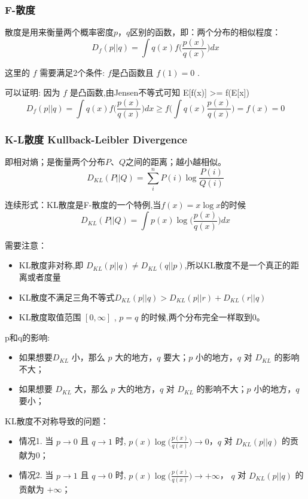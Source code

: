 \documentclass[12pt]{article}
\begin{document}
\subsubsection{F-散度}
散度是用来衡量两个概率密度$p$，$q$区别的函数，即：两个分布的相似程度：
$$
D_f(p||q) = \int q(x) f\Big(\frac{p(x)}{q(x)}\Big)dx
$$

这里的 $f$ 需要满足2个条件: $f$是凸函数且 $f(1) = 0$ .

可以证明: 因为 $f$ 是凸函数,由Jensen不等式可知 E[f(x)] >= f(E[x])
$$
D_f(p||q) = \int q(x) f\Big(\frac{p(x)}{q(x)}\Big)dx \ge f\Big(\int q(x)\frac{p(x)}{q(x)}\Big) = f(x) = 0
$$


\subsubsection{K-L散度 Kullback-Leibler Divergence}
即相对熵；是衡量两个分布$P$、$Q$之间的距离；越小越相似。
$$
D_{KL}(P||Q) = \sum_i^nP(i) \log{\frac{P(i)}{Q(i)}}
$$

连续形式：KL散度是F-散度的一个特例,当$f(x) = x\log x$的时候
$$
D_{KL}(P||Q) = \int p(x) \log\Big(\frac{p(x)}{q(x)}\Big)dx
$$

需要注意：
\begin{itemize}
\setlength{\itemsep}{0pt}
\setlength{\parsep}{0pt}
\setlength{\parskip}{0pt}
    \item KL散度非对称,即 $D_{KL}(p||q) \neq D_{KL}(q||p)$,所以KL散度不是一个真正的距离或者度量
    \item KL散度不满足三角不等式$D_{KL}(p||q) > D_{KL}(p||r) + D_{KL}(r||q)$
    \item KL散度取值范围 $[0, \infty]$ , $p=q$ 的时候,两个分布完全一样取到0。
\end{itemize}

p和q的影响:
\begin{itemize}
\setlength{\itemsep}{0pt}
\setlength{\parsep}{0pt}
\setlength{\parskip}{0pt}
    \item 如果想要$D_{KL}$ 小，那么 $p$ 大的地方，$q$ 要大；$p$ 小的地方，$q$ 对 $D_{KL}$ 的影响不大；
    \item 如果想要 $D_{KL}$ 大，那么 $p$ 大的地方，$q$ 对 $D_{KL}$ 的影响不大；$p$ 小的地方，$q$ 要小；
\end{itemize}

KL散度不对称导致的问题：
\begin{itemize}
\setlength{\itemsep}{0pt}
\setlength{\parsep}{0pt}
\setlength{\parskip}{0pt}
    \item 情况1. 当 $p \rightarrow 0$ 且 $q \rightarrow 1$ 时, $p(x) \log\Big(\frac{p(x)}{q(x)}\Big) \rightarrow 0$，$q$ 对 $D_{KL}(p||q) $ 的贡献为0；
    \item 情况2. 当 $p \rightarrow 1$ 且 $q \rightarrow 0$ 时, $p(x) \log\Big(\frac{p(x)}{q(x)}\Big) \rightarrow +\infty$， $q$ 对 $D_{KL}(p||q) $ 的贡献为 $+\infty$；
\end{itemize}
\end{document}
